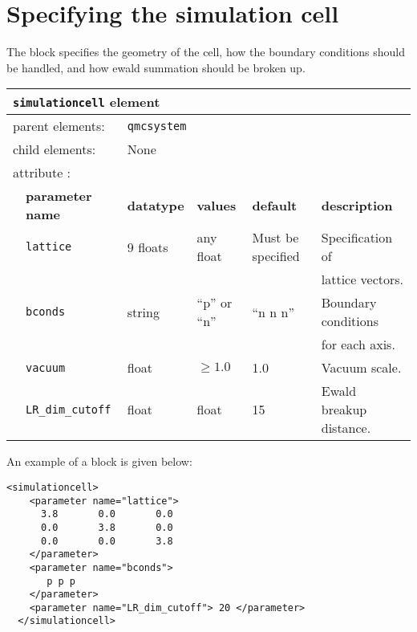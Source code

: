 \section{Specifying the simulation cell}
\label{chap:simulationcell}

The  block specifies the geometry of the cell, how the boundary conditions should be handled, and how ewald summation should be broken up.

\begin{table}[h]
\begin{center}
\begin{tabularx}{\textwidth}{l l l l l X }
\hline
\multicolumn{6}{l}{\texttt{simulationcell} element} \\
\hline
\multicolumn{2}{l}{parent elements:} & \multicolumn{4}{l}{\texttt{qmcsystem}}\\
\multicolumn{2}{l}{child  elements:} & \multicolumn{4}{l}{None}\\
\multicolumn{2}{l}{attribute      :} & \multicolumn{4}{l}{}\\
   &   \bfseries parameter name            & \bfseries datatype & \bfseries values & \bfseries default   & \bfseries description \\
\hline
   &   \texttt{lattice}  & 9 floats & any float & Must be specified & Specification of \\
   &                     &        &             &                   & lattice vectors. \\
   &   \texttt{bconds}   & string & ``p'' or ``n''  & ``n n n'' & Boundary conditions \\
   &                     &        &             &           & for each axis. \\
   &   \texttt{vacuum} & float & $\ge 1.0$ & 1.0        & Vacuum scale. \\
   &   \texttt{LR\_dim\_cutoff} & float & float & 15        & Ewald breakup distance. \\
\hline
\end{tabularx}
\end{center}
\end{table}

An example of a  block is given below:
\begin{lstlisting}[style=QMCPXML]
  <simulationcell>
    <parameter name="lattice">
      3.8       0.0       0.0
      0.0       3.8       0.0
      0.0       0.0       3.8
    </parameter>
    <parameter name="bconds">
       p p p
    </parameter>
    <parameter name="LR_dim_cutoff"> 20 </parameter>
  </simulationcell>
\end{lstlisting}

